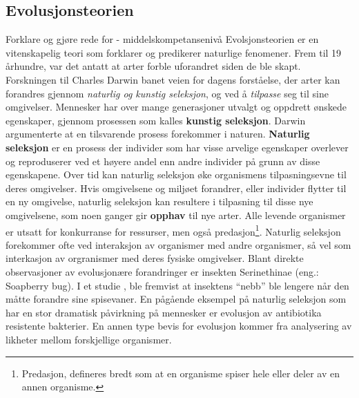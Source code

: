 \documentclass[main.tex]{subfiles}
\begin{document}
\subsection{Evolusjonsteorien}
{\color{Blue}Forklare og gjøre rede for - middelskompetansenivå}
\newline\newline
Evolsjonsteorien er en vitenskapelig teori som forklarer og predikerer naturlige fenomener. Frem til 19 århundre, var det antatt at arter forble uforandret siden de ble skapt. Forskningen til Charles Darwin banet veien for dagens forståelse, der arter kan forandres gjennom \emph{naturlig og kunstig seleksjon}, og ved å \emph{tilpasse} seg til sine omgivelser.
\newline\newline
Mennesker har over mange generasjoner utvalgt og oppdrett ønskede egenskaper, gjennom prosessen som kalles \textbf{kunstig seleksjon}. Darwin argumenterte at en tilsvarende prosess forekommer i naturen. \textbf{Naturlig seleksjon} er en prosess der individer som har visse arvelige egenskaper overlever og reproduserer ved et høyere andel enn andre individer på grunn av disse egenskapene. Over tid kan naturlig seleksjon øke organismens tilpasningsevne til deres omgivelser. Hvis omgivelsene og miljøet forandrer, eller individer flytter til en ny omgivelse, naturlig seleksjon kan resultere i tilpasning til disse nye omgivelsene, som noen ganger gir \textbf{opphav} til nye arter.
\newline\newline
Alle levende organismer er utsatt for konkurranse for ressurser, men også predasjon\footnote{Predasjon, defineres bredt som at en organisme spiser hele eller deler av en annen organisme.}. Naturlig seleksjon forekommer ofte ved interaksjon av organismer med andre organismer, så vel som interkasjon av orgranismer med deres fysiske omgivelser.
\newline\newline
Blant direkte observasjoner av evolusjonære forandringer er insekten Serinethinae (eng.: Soapberry bug). I et studie \cite{cabo92}, ble fremvist at insektens ``nebb'' ble lengere når den måtte forandre sine spisevaner. En pågående eksempel på naturlig seleksjon som har en stor dramatisk påvirkning på mennesker er evolusjon av antibiotika resistente bakterier. En annen type bevis for evolusjon kommer fra analysering av likheter mellom forskjellige organismer. 
\end{document}
